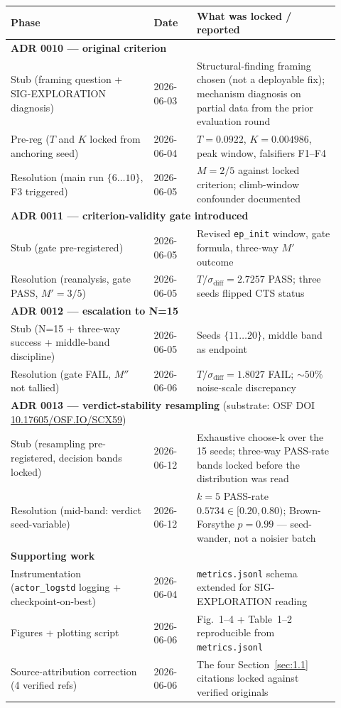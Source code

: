 \documentclass{article}
\newcommand{\code}[1]{\texttt{#1}}
\begin{document}
\begin{table}[!ht]
\centering
\small
\begin{tabular}{@{}p{0.40\linewidth}p{0.12\linewidth}p{0.40\linewidth}@{}}
\toprule
Phase & Date & What was locked / reported \\
\midrule
\multicolumn{3}{l}{\textbf{ADR 0010 --- original criterion}} \\
Stub (framing question + SIG-EXPLORATION diagnosis) & 2026-06-03 & Structural-finding framing chosen (not a deployable fix); mechanism diagnosis on partial data from the prior evaluation round \\
Pre-reg ($T$ and $K$ locked from anchoring seed)    & 2026-06-04 & $T = 0.0922$, $K = 0.004986$, peak window, falsifiers F1--F4 \\
Resolution (main run $\{6 \ldots 10\}$, F3 triggered) & 2026-06-05 & $M = 2/5$ against locked criterion; climb-window confounder documented \\
\multicolumn{3}{l}{\textbf{ADR 0011 --- criterion-validity gate introduced}} \\
Stub (gate pre-registered)                          & 2026-06-05 & Revised \code{ep\_init} window, gate formula, three-way $M'$ outcome \\
Resolution (reanalysis, gate PASS, $M' = 3/5$)      & 2026-06-05 & $T/\sigma_\mathrm{diff} = 2.7257$ PASS; three seeds flipped CTS status \\
\multicolumn{3}{l}{\textbf{ADR 0012 --- escalation to N=15}} \\
Stub (N=15 + three-way success + middle-band discipline) & 2026-06-05 & Seeds $\{11 \ldots 20\}$, middle band as endpoint \\
Resolution (gate FAIL, $M''$ not tallied)           & 2026-06-06 & $T/\sigma_\mathrm{diff} = 1.8027$ FAIL; $\sim 50\%$ noise-scale discrepancy \\
\multicolumn{3}{l}{\textbf{ADR 0013 --- verdict-stability resampling} \quad (substrate: OSF DOI \href{https://doi.org/10.17605/OSF.IO/SCX59}{10.17605/OSF.IO/SCX59})} \\
Stub (resampling pre-registered, decision bands locked) & 2026-06-12 & Exhaustive choose-k over the 15 seeds; three-way PASS-rate bands locked before the distribution was read \\
Resolution (mid-band: verdict seed-variable)        & 2026-06-12 & $k=5$ PASS-rate $0.5734 \in [0.20, 0.80)$; Brown-Forsythe $p = 0.99$ --- seed-wander, not a noisier batch \\
\multicolumn{3}{l}{\textbf{Supporting work}} \\
Instrumentation (\code{actor\_logstd} logging + checkpoint-on-best) & 2026-06-04 & \code{metrics.jsonl} schema extended for SIG-EXPLORATION reading \\
Figures + plotting script                           & 2026-06-06 & Fig.~1--4 + Table~1--2 reproducible from \code{metrics.jsonl} \\
Source-attribution correction (4 verified refs)     & 2026-06-06 & The four Section~\ref{sec:1.1} citations locked against verified originals \\
\bottomrule
\end{tabular}
\end{table}
\end{document}
